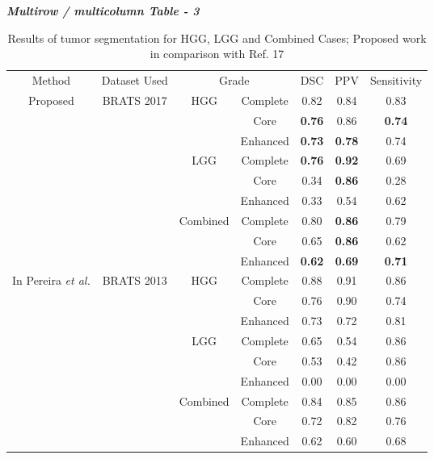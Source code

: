 \documentclass{article}
\begin{document}
	{\Large \textbf{\textit{Multirow / multicolumn Table - 3}}}
	
	\begin{table}[H]
		\caption {Results of tumor segmentation for HGG, LGG and Combined Cases;
			Proposed work in comparison with Ref. 17} 
		{\begin{tabular}{|c|c|c|c|c|c|c|} \toprule
				
				Method & Dataset Used & \multicolumn{2}{c}{Grade} & DSC & PPV & Sensitivity\\
				\cline{1-7}
				\multirow{6}{*}{Proposed}
				& \multirow{6}{*}{BRATS 2017} & \multirow{3}{*}{HGG} & 
				Complete & 0.82 & 0.84 & 0.83\\
				&&&Core & \bf0.76 & 0.86 & \bf0.74\\
				&&&Enhanced & \bf0.73 & \bf0.78 & 0.74\\
				\cline{3-7}
				
				&&\multirow{3}{*}{LGG} & 
				Complete & \bf0.76 & \bf0.92 & 0.69\\
				&&&Core & 0.34 & \bf0.86 & 0.28\\
				&&&Enhanced & 0.33 & 0.54 & 0.62\\
				\cline{3-7}
				
				&&\multirow{3}{*}{Combined} & 
				Complete & 0.80 & \bf0.86 & 0.79\\
				&&&Core & 0.65 & \bf0.86 & 0.62\\
				&&&Enhanced & \bf0.62 & \bf0.69 & \bf0.71\\
				\cline{1-7}
				
				\multirow{6}{*}{In Pereira {\it et al.}\cite{17}}
				& \multirow{6}{*}{BRATS 2013} & \multirow{3}{*}{HGG} & 
				Complete & 0.88 & 0.91 & 0.86\\
				&&&Core & 0.76 & 0.90 & 0.74\\
				&&&Enhanced & 0.73 & 0.72 & 0.81\\
				\cline{3-7}
				
				&&\multirow{3}{*}{LGG} & 
				Complete & 0.65 & 0.54 & 0.86\\
				&&&Core & 0.53 & 0.42 & 0.86\\
				&&&Enhanced & 0.00 & 0.00 & 0.00\\
				\cline{3-7}
				
				&&\multirow{3}{*}{Combined} & 
				Complete & 0.84 & 0.85 & 0.86\\
				&&&Core & 0.72 & 0.82 & 0.76\\
				&&&Enhanced & 0.62 & 0.60 & 0.68\\
				
				\bottomrule		
		\end{tabular}}	
	\end{table}
	
\end{document}
